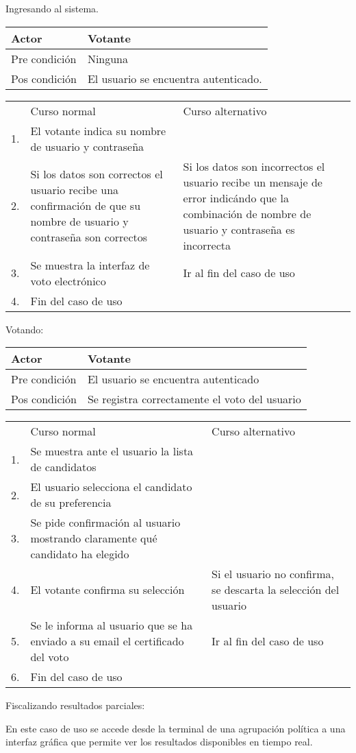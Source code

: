 \documentclass{article}
\begin{document}

Ingresando al sistema.



\begin{tabular}{ll}
Actor & Votante \\
\hline
Pre condición & Ninguna \\
\hline
Pos condición & El usuario se encuentra autenticado. \\
\hline
\end{tabular}




\begin{tabular}{c p{4cm}|p{4cm}}
 & Curso normal & Curso alternativo \\
 1. & El votante indica su nombre de usuario y contraseña &  \\
 2. & Si los datos son correctos el usuario recibe una confirmación de que su nombre de usuario y contraseña son correctos & Si los datos son incorrectos el usuario recibe un mensaje de error indicándo que la combinación de nombre de usuario y contraseña es incorrecta \\
 3. & Se muestra la interfaz de voto electrónico & Ir al fin del caso de uso \\
4. & Fin del caso de uso& \\ 
\end{tabular}

\bigskip

Votando:


\begin{tabular}{ll}
Actor & Votante \\
\hline
Pre condición & El usuario se encuentra autenticado \\
\hline
Pos condición & Se registra correctamente el voto del usuario \\
\hline
\end{tabular}




\begin{tabular}{c p{4cm}|p{4cm}}
 & Curso normal & Curso alternativo \\
 1. & Se muestra ante el usuario la lista de candidatos &   \\
 2. & El usuario selecciona el candidato de su preferencia &   \\
 3. & Se pide confirmación al usuario mostrando claramente qué candidato ha elegido &   \\
 4. & El votante confirma su selección & Si el usuario no confirma, se descarta la selección del usuario  \\
 5. & Se le informa al usuario que se ha enviado a su e\-mail el certificado del voto & Ir al fin del caso de uso \\
 6. & Fin del caso de uso & \\
\end{tabular}


\bigskip

Fiscalizando resultados parciales:

En este caso de uso se accede desde la terminal de una agrupación política a una interfaz gráfica que permite ver los resultados disponibles en tiempo real.
\end{document}
